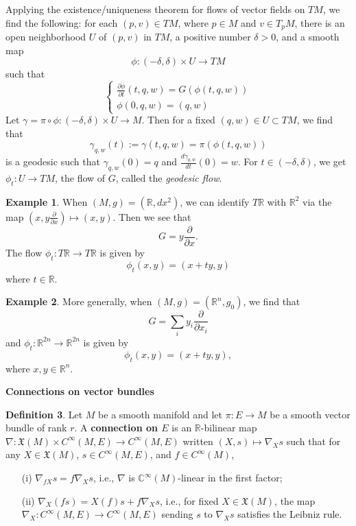 \documentclass{amsart}
\numberwithin{equation}{section}
\newcommand{\bR}{\mathbb{R}}
\newcommand{\fX}{\mathfrak{X}}
\theoremstyle{definition}
\newtheorem{definition}{Definition} [section]
\newtheorem{example}[definition]{Example}
\theoremstyle{theorem}
\begin{document}
Applying the existence/uniqueness theorem for flows of vector fields on $TM$, we find the following: 
for each $(p,v) \in TM$, where $p\in M$ and $v\in T_pM$, there is an open neighborhood $U$ of $(p,v)$ in $TM$, a positive number $\delta > 0$, 
and a smooth map 
\[
\phi : (-\delta, \delta) \times U \to TM
\]
such that 
\[
\begin{cases}
\frac{\partial \phi}{\partial t}(t,q,w) = G(\phi(t,q,w))\\
\phi(0,q,w) = (q,w)
\end{cases}
\]
Let $\gamma = \pi \circ \phi : (-\delta, \delta) \times U \to M$. Then for a fixed $(q,w) \in U \subset TM$, we find that 
\[
\gamma_{q,w}(t) := \gamma(t,q,w) = \pi(\phi(t,q,w))
\]
is a geodesic such that $\gamma_{q,w}(0) = q$ and $\frac{d \gamma_{q,w}}{dt}(0) = w$. 
For $t \in (-\delta, \delta)$, we get $\phi_t : U \to TM$, the flow of $G$, called the {\em geodesic flow}. 

\begin{example}
When $(M,g)=(\bR, dx^2)$, we can identify $T\bR$ with $\bR^2$ via the map 
$(x, y \frac{\partial}{\partial x}) \mapsto (x,y)$. Then we see that 
\[
G = y \frac{\partial}{\partial x}.
\]
The flow $\phi_t : T\bR \to T\bR$ is given by 
\[
\phi_t(x,y) = (x + ty, y)
\]
where $t\in \bR$.
\end{example}

\begin{example}
More generally, when  $(M,g)= (\bR^n, g_0)$, we find that 
\[
G = \sum_{i} y_i \frac{\partial}{\partial x_i}
\]
and $\phi_t : \bR^{2n} \to \bR^{2n}$ is given by 
\[
\phi_t(x,y) = (x + ty, y), 
\]
where $x,y\in \bR^n$.
\end{example}

\medskip

\noindent
{\bf \large Connections on vector bundles}



\begin{definition} \label{connection-E}
Let $M$ be a smooth manifold and let $\pi : E \to M$ be a smooth vector bundle of rank $r$. A \textbf{connection on $E$} is an
$\bR$-bilinear map $\nabla : \mathfrak{X}(M) \times C^{\infty}(M,E) \to C^{\infty}(M, E)$ written $(X,s) \mapsto \nabla_{X}s$ such that 
for any $X\in \fX(M)$, $s\in C^\infty(M,E)$, and $f\in C^\infty(M)$,
\begin{enumerate}
\item[(i)] $\nabla_{fX}s = f\nabla_X s$, i.e., $\nabla$ is $\mathbb{C}^{\infty}(M)$-linear in the first factor;
\item[(ii)] $\nabla_X(fs)=X(f) s + f\nabla_X s$, i.e., for fixed $X\in \fX(M)$, the map
$\nabla_X:C^\infty(M,E)\to C^\infty(M,E)$ sending $s$ to  $\nabla_X s$  satisfies the Leibniz rule.
\end{enumerate}
\end{definition} 
\end{document}
